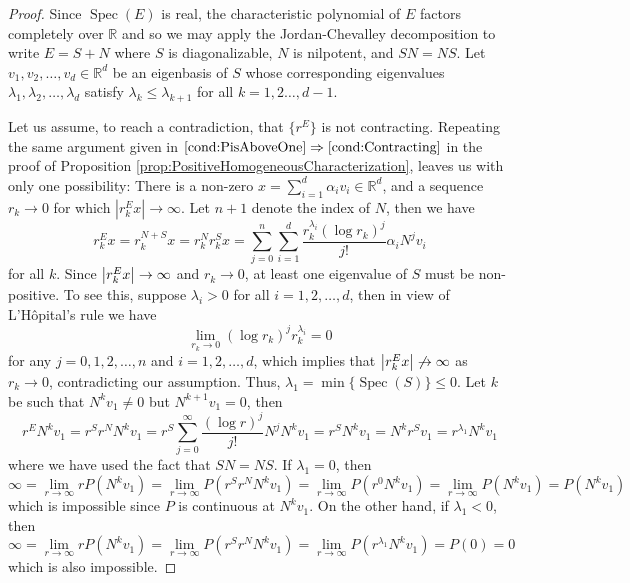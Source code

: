\documentclass[11pt]{article}
\theoremstyle{remark}
\newcommand\Spec{\operatorname{Spec}}
\newcommand\R{\mathbb{R}}
\newcommand{\f}[2]{\frac{#1}{#2}}
\begin{document}
\begin{proof}
Since $\Spec(E)$ is real, the characteristic polynomial of $E$ factors completely over $\R$ and so we may apply the Jordan-Chevalley decomposition to write $E=S+N$ where $S$ is diagonalizable, $N$ is nilpotent, and $SN=NS$. Let $v_1,v_2,\dots,v_d \in \R^d$ be an eigenbasis of $S$ whose corresponding eigenvalues $\lambda_1,\lambda_2,\dots,\lambda_d$ satisfy $\lambda_k\leq \lambda_{k+1}$ for all $k=1,2\dots,d-1$.

Let us assume, to reach a contradiction, 
that $\{ r^E \}$ is not contracting. Repeating the same argument given in $\ref{cond:PisAboveOne}\Rightarrow\ref{cond:Contracting}$ in the proof of Proposition \ref{prop:PositiveHomogeneousCharacterization}, leaves us with only one possibility: There is a non-zero $x = \sum^d_{i=1}\alpha_i v_i \in\mathbb{R}^d$, and a sequence $r_k\to 0$ for which $|r_k^E x|\to\infty$. Let $n+1$ denote the index of $N$, then we have
\begin{equation*}
r^E_k x = r_k^{N+S} x 
= r_k^N r_k^S x 
= \sum_{j=0}^n\sum_{i=1}^d \f{r_k^{\lambda_i}(\log r_k)^j}{j!}   \alpha_iN^j v_i
\end{equation*}
for all $k$. Since $\abs{r_k^E x} \to \infty$ and $r_k \to 0$, at least one eigenvalue of $S$ must be non-positive. To see this, suppose $\lambda_i > 0$ for all $i = 1,2,\dots,d$, then in view of L'H\^{o}pital's rule we have
\begin{equation*}
    \lim_{r_k \to 0}(\log r_k)^j r_k^{\lambda_i} = 0  
\end{equation*}
for any $j =0, 1,2,\dots,n$ and $i =1,2,\dots,d$, which implies that $\abs{r^E_k x} \not\to \infty$ as $r_k \to 0$, contradicting our assumption. Thus, $\lambda_1 = \min\{ \Spec(S)\} \leq 0$. Let $k$ be such that $N^k v_1 \neq 0$ but $N^{k+1} v_1 = 0$, then
\begin{equation*}
    r^E N^k v_1 = r^S r^N N^k v_1 = r^S \sum_{j=0}^\infty \f{(\log r)^j}{j!}N^j N^k v_1 = r^S N^k v_1 = N^k r^S  v_1 =  r^{\lambda_{1}} N^k  v_1
\end{equation*}
where we have used the fact that $SN = NS$. If $\lambda_1= 0$, then 
\begin{equation*}
    \infty =  \lim_{r\to \infty} rP(N^k v_1)  = \lim_{r\to \infty} P( r^S r^N N^k v_1) =  \lim_{r\to \infty}P(r^{0} N^k v_1)= \lim_{r\to \infty}P( N^k v_1) = P(N^k v_1)
\end{equation*}
which is impossible since $P$ is continuous at $N^k v_1$. On the other hand, if $\lambda_1 < 0$, then
\begin{equation*}
    \infty = \lim_{r\to \infty} rP(N^k v_1) = \lim_{r\to \infty} P(r^S r^N N^k v_1) = \lim_{r\to \infty}P(r^{\lambda_1} N^k v_1) = P(0) = 0
\end{equation*}
which is also impossible. 
\end{proof}
\end{document}
